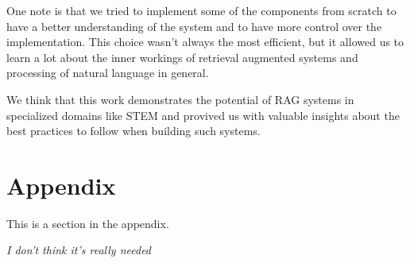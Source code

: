 \documentclass[11pt]{article}
\begin{document}
One note is that we tried to implement some of the components from scratch
to have a better understanding of the system and to have more control over the
implementation.
This choice wasn't always the most efficient, but it allowed us to learn a lot
about the inner workings of retrieval augmented systems and processing of natural 
language in general. 

We think that this work demonstrates the potential of RAG systems in specialized 
domains like STEM and provived us with valuable insights about the best practices 
to follow when building such systems.

\newpage



\nocite{*}

\appendix

\section{Appendix}
\label{sec:appendix}

This is a section in the appendix.

\textit{I don't think it's really needed}
\end{document}
